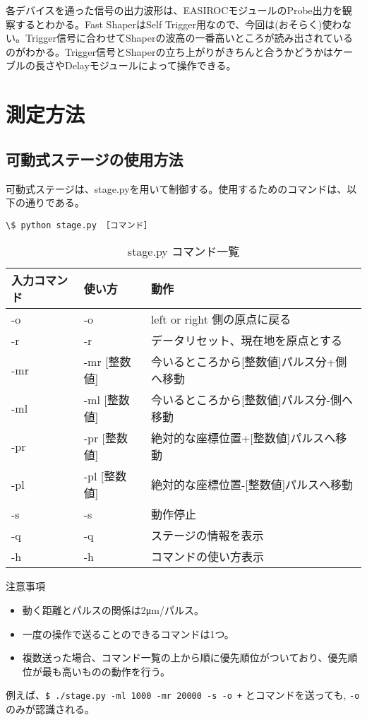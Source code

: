 \documentclass[10pt,a4j]{jarticle}
\begin{document}
各デバイスを通った信号の出力波形は、EASIROCモジュールのProbe出力を観察するとわかる。Fast ShaperはSelf Trigger用なので、今回は(おそらく)使わない。Trigger信号に合わせてShaperの波高の一番高いところが読み出されているのがわかる。Trigger信号とShaperの立ち上がりがきちんと合うかどうかはケーブルの長さやDelayモジュールによって操作できる。

\section{測定方法}

\subsection{可動式ステージの使用方法}

可動式ステージは、stage.pyを用いて制御する。使用するためのコマンドは、以下の通りである。
\begin{lstlisting}[caption=stage.pyのコマンド]
\$ python stage.py ［コマンド］  
\end{lstlisting}

\begin{table}[htbp]
  \begin{center}
    \caption{stage.py コマンド一覧}
    \begin{tabular}{|l|l|l|} \hline
      入力コマンド & 使い方 & 動作 \\ \hline \hline
      -o & -o & left or right 側の原点に戻る \\ \hline
      -r & -r & データリセット、現在地を原点とする \\ \hline
      -mr & -mr [整数値] & 今いるところから[整数値]パルス分+側へ移動 \\ \hline
      -ml & -ml [整数値] & 今いるところから[整数値]パルス分-側へ移動 \\ \hline
      -pr & -pr [整数値] & 絶対的な座標位置+[整数値]パルスへ移動 \\ \hline
      -pl & -pl [整数値] & 絶対的な座標位置-[整数値]パルスへ移動 \\ \hline
      -s & -s & 動作停止 \\ \hline
      -q & -q & ステージの情報を表示 \\ \hline
      -h & -h & コマンドの使い方表示 \\ \hline
    \end{tabular}
  \end{center}
\end{table}

\begin{itembox}[l]{注意事項}
  \begin{itemize}
  \item 動く距離とパルスの関係は2μm/パルス。
  \item 一度の操作で送ることのできるコマンドは1つ。 
  \item 複数送った場合、コマンド一覧の上から順に優先順位がついており、優先順位が最も高いものの動作を行う。
  \end{itemize}
  例えば、{\tt \$ ./stage.py -ml 1000 -mr 20000 -s -o +} とコマンドを送っても, {\tt -o} のみが認識される。
\end{itembox}
\end{document}
